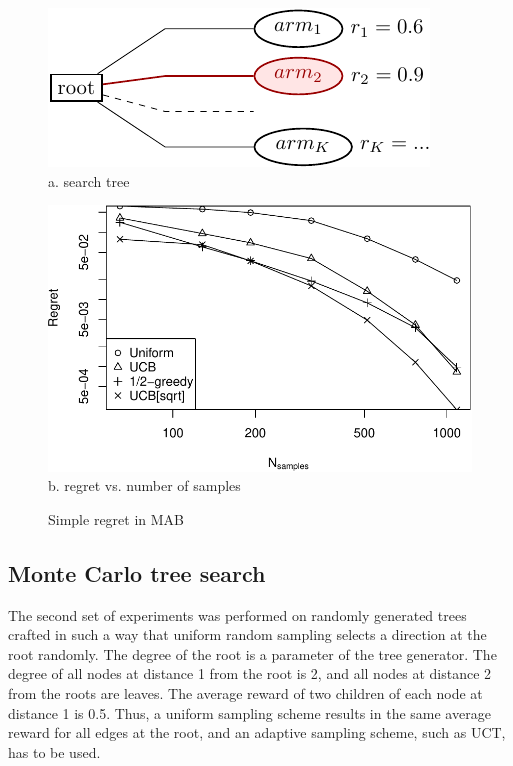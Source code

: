 \documentclass[letterpaper]{article}
\begin{document}
\begin{figure}[h!]
  \begin{minipage}[c]{1.0\linewidth}
    \centering
    \includegraphics[scale=0.9]{onelevel-tree.pdf}\\
    a. search tree
    \vspace{1em}
  \end{minipage}
  \begin{minipage}[c]{1.0\linewidth}
    \centering
    \includegraphics[scale=0.45]{flat-trilevel-k=64-uqb=8.pdf}\\
    b. regret vs. number of samples
  \end{minipage}
  \caption{Simple regret in MAB}
  \label{fig:mab-simple-regret}
\end{figure}

\subsection{Monte Carlo tree search}
\label{sec:emp-mcts}

The second set of experiments was performed on randomly generated
trees crafted in such a way that uniform random sampling selects a
direction at the root randomly. The degree of the root is a parameter of
the tree generator. The degree of all nodes at distance 1 from the
root is 2, and all nodes at distance 2 from the roots are leaves. The
average reward of two children of each node at distance 1 is
0.5. Thus, a uniform sampling scheme results in the same average reward for
all edges at the root, and an adaptive sampling scheme, such as UCT,
has to be used.
\end{document}
